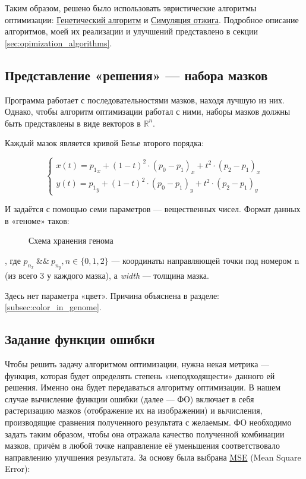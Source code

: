 Таким образом, решено было использовать эвристические алгоритмы оптимизации:
\href{https://en.wikipedia.org/wiki/Simulated_annealing}{Генетический алгоритм} и \href{https://en.wikipedia.org/wiki/Simulated_annealing}{Симуляция отжига}.
Подробное описание алгоритмов, моей их реализации и улучшений представлено в секции \ref{sec:opimization_algorithms}.

\subsection{Представление «решения»  — набора мазков}
Программа работает с последовательностями мазков, находя лучшую из них.
Однако, чтобы алгоритм оптимизации работал с ними, наборы мазков должны быть представлены в виде векторов в $\mathbb{R}^n$.

Каждый мазок является кривой Безье второго порядка:

\begin{equation}\label{eq:bezier_curve}
    \begin{cases}
        x(t) = {p_1}_x + (1 - t)^2 \cdot (p_0 - p_1)_x + t^2 \cdot (p_2 - p_1)_x \\
        y(t) = {p_1}_y + (1 - t)^2 \cdot (p_0 - p_1)_y + t^2 \cdot (p_2 - p_1)_y
    \end{cases}
\end{equation}

И задаётся с помощью семи параметров — вещественных чисел.
Формат данных в «геноме» таков:

\begin{figure}[h]
    \centering
    \caption{Схема хранения генома}
    \label{fig:genome_contents_table}
\end{figure}


, где $p_{n_x} ~\&\&~ p_{n_y}, n \in \{ 0, 1, 2 \}$ — координаты направляющей точки под номером n (из всего 3 у каждого мазка),
а \textit{width}  — толщина мазка.

Здесь нет параметра  «цвет».
Причина объяснена в разделе: \ref{subsec:color_in_genome}.

\subsection{Задание функции ошибки}
Чтобы решить задачу алгоритмом оптимизации, нужна некая метрика — функция, которая будет определять степень «неподходящести» данного ей решения.
Именно она будет передаваться алгоритму оптимизации.
В нашем случае вычисление функции ошибки (далее — ФО) включает в себя растеризацию мазков (отображение их на изображении) и вычисления, производящие сравнения полученного результата с желаемым.
ФО необходимо задать таким образом, чтобы она отражала качество полученной комбинации мазков,
причём в любой точке направление её уменьшения соответствовало направлению улучшения результата.
За основу была выбрана \href{https://en.wikipedia.org/wiki/Mean_squared_error}{MSE} (Mean Square Error):

